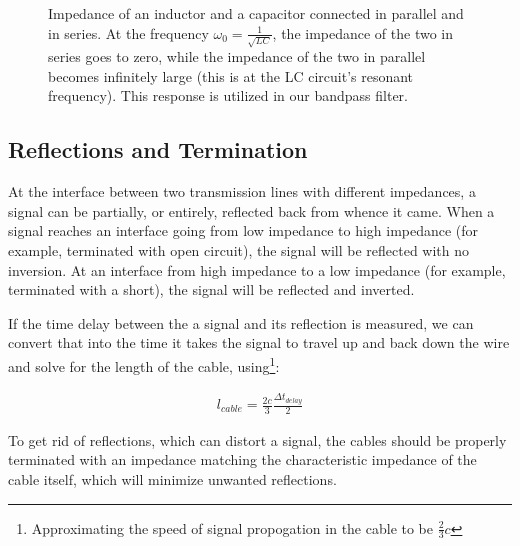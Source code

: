 \documentclass[12pt]{article}
\begin{document}
\begin{figure}[H]
\caption{Impedance of an inductor and a capacitor connected in parallel and in series. At the frequency $\omega_0=\frac{1}{\sqrt{LC}}$, the impedance of the two in series goes to zero, while the impedance of the two in parallel becomes infinitely large (this is at the LC circuit's resonant frequency). This response is utilized in our bandpass filter.}
\label{fig:LCimpedances}
\end{figure}

\subsection*{Reflections and Termination}
At the interface between two transmission lines with different impedances, a signal can be partially, or entirely, reflected back from whence it came. When a signal reaches an interface going from low impedance to high impedance (for example, terminated with open circuit), the signal will be reflected with no inversion. At an interface from high impedance to a low impedance (for example, terminated with a short), the signal will be reflected and inverted. 

If the time delay between the a signal and its reflection is measured, we can convert that into the time it takes the signal to travel up and back down the wire and solve for the length of the cable, using\footnote{Approximating the speed of signal propogation in the cable to be $\frac{2}{3}c$}:

\begin{eqnarray}
l_{cable} = \frac{2c}{3} \frac{\Delta{t}_{delay}}{2} \label{eq:cablelength}
\end{eqnarray}

To get rid of reflections, which can distort a signal, the cables should be properly terminated with an impedance matching the characteristic impedance of the cable itself, which will minimize unwanted reflections.
\end{document}
